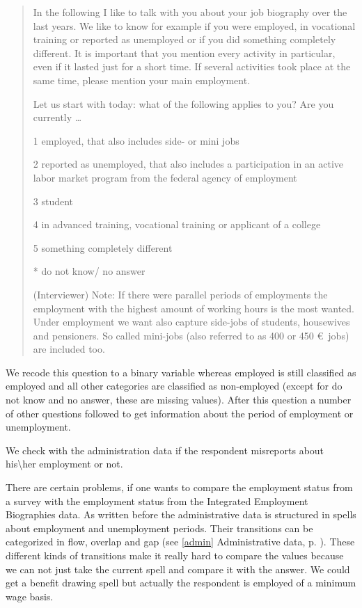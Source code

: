 \begin{quote}
\begin {small}
In the following I like to talk with you about your job biography over the last years. We like to know for example if you were employed, in vocational training or reported as unemployed or if you did something completely different. It is important that you mention every activity in particular, even if it lasted just for a short time. If several activities took place at the same time, please mention your main employment.

Let us start with today: what of the following applies to you? Are you currently \ldots

1 employed, that also includes side- or mini jobs

2 reported as unemployed, that also includes a participation in an active labor market program from the federal agency of employment

3 student

4 in advanced training, vocational training or applicant of a college

5 something completely different

* do not know/ no answer

(Interviewer) Note: If there were parallel periods of employments the employment with the highest amount of working hours is the most wanted. Under employment we want also capture side-jobs of students, housewives and pensioners. So called mini-jobs (also referred to as 400 or 450 \euro \ jobs) are included too.
\end{small}
\end{quote}

We recode this question to a binary variable whereas employed is still classified as employed and all other categories are classified as non-employed (except for do not know and no answer, these are missing values). After this question a number of other questions followed to get information about the period of employment or unemployment.

We check with the administration data if the respondent misreports about his\textbackslash her employment or not.

There are certain problems, if one wants to compare the employment status from a survey with the employment status from the Integrated Employment Biographies data. As written before the administrative data is structured in spells about employment and unemployment periods. Their transitions can be categorized in flow, overlap and gap (see \ref{admin} Administrative data, p. \pageref{admin}). These different kinds of transitions make it really hard to compare the values because we can not just take the current spell and compare it with the answer. We could get a benefit drawing spell but actually the respondent is employed of a minimum wage basis.

